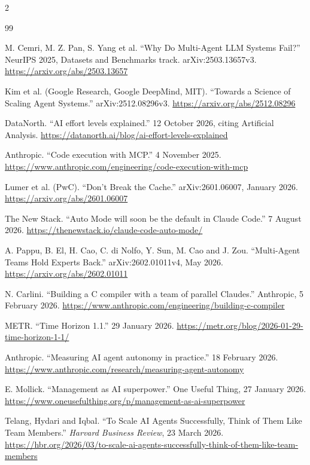 \documentclass[11pt,letterpaper]{article}
\begin{document}
\renewcommand{\refname}{References}
\begin{multicols}{2}
{\footnotesize\raggedright{}
\begin{thebibliography}{99}
\setlength{\itemsep}{0.08em}

 M. Cemri, M. Z. Pan, S. Yang et al. ``Why Do Multi-Agent LLM Systems Fail?''
NeurIPS 2025, Datasets and Benchmarks track. arXiv:2503.13657v3.
\url{https://arxiv.org/abs/2503.13657}

 Kim et al. (Google Research, Google DeepMind, MIT). ``Towards a Science of
Scaling Agent Systems.'' arXiv:2512.08296v3.
\url{https://arxiv.org/abs/2512.08296}

 DataNorth. ``AI effort levels explained.'' 12 October 2026, citing
Artificial Analysis.
\url{https://datanorth.ai/blog/ai-effort-levels-explained}

 Anthropic. ``Code execution with MCP.'' 4 November 2025.
\url{https://www.anthropic.com/engineering/code-execution-with-mcp}

 Lumer et al. (PwC). ``Don't Break the Cache.'' arXiv:2601.06007, January 2026.
\url{https://arxiv.org/abs/2601.06007}

 The New Stack. ``Auto Mode will soon be the default in Claude Code.''
7 August 2026.
\url{https://thenewstack.io/claude-code-auto-mode/}

 A. Pappu, B. El, H. Cao, C. di Nolfo, Y. Sun, M. Cao and J. Zou.
``Multi-Agent Teams Hold Experts Back.'' arXiv:2602.01011v4, May 2026.
\url{https://arxiv.org/abs/2602.01011}

 N. Carlini. ``Building a C compiler with a team of parallel Claudes.''
Anthropic, 5 February 2026.
\url{https://www.anthropic.com/engineering/building-c-compiler}

 METR. ``Time Horizon 1.1.'' 29 January 2026.
\url{https://metr.org/blog/2026-01-29-time-horizon-1-1/}

 Anthropic. ``Measuring AI agent autonomy in practice.'' 18 February 2026.
\url{https://www.anthropic.com/research/measuring-agent-autonomy}

 E. Mollick. ``Management as AI superpower.'' One Useful Thing,
27 January 2026.
\url{https://www.oneusefulthing.org/p/management-as-ai-superpower}

 Telang, Hydari and Iqbal. ``To Scale AI Agents Successfully, Think of Them
Like Team Members.'' \emph{Harvard Business Review}, 23 March 2026.
\url{https://hbr.org/2026/03/to-scale-ai-agents-successfully-think-of-them-like-team-members}


\end{thebibliography}}
\end{multicols}
\end{document}
